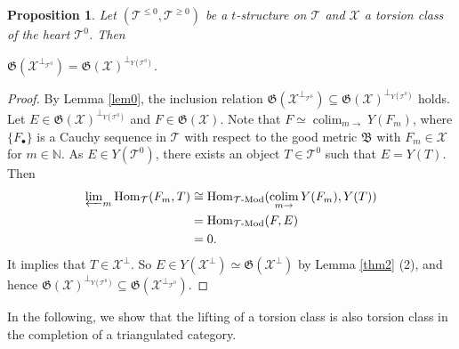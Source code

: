 \documentclass[11pt,a4paper]{amsart}
\numberwithin{equation}{section} \theoremstyle{plain}
\newtheorem{prop}[lem]{Proposition}
\numberwithin{equation}{section} \theoremstyle{definition}
\begin{document}
\begin{prop} Let $(\mathcal{T}^{\leq0},\mathcal{T}^{\geq0})$ be a $t$-structure on $\mathcal{T}$ and $\mathcal{X}$ a torsion class of the heart $\mathcal{T}^{0}$. Then
\begin{center}
$\mathfrak{G}(\mathcal{X}^{\perp_{\mathcal{T}^{0}}})=\mathfrak{G}(\mathcal{X})^{\perp_{Y(\mathcal{T}^{0})}}$.
\end{center}
\end{prop}
\begin{proof} By Lemma \ref{lem0}, the inclusion relation $\mathfrak{G}(\mathcal{X}^{\perp_{\mathcal{T}^{0}}})\subseteq\mathfrak{G}(\mathcal{X})^{\perp_{Y(\mathcal{T}^{0})}}$ holds. Let $E\in\mathfrak{G}(\mathcal{X})^{\perp_{Y(\mathcal{T}^{0})}}$ and $F\in\mathfrak{G}(\mathcal{X})$. Note that $F\simeq\displaystyle\operatorname*{colim}_{m\to}Y(F_{m})$, where $\{F_{\bullet}\}$ is a Cauchy sequence in $\mathcal{T}$ with respect to the good metric $\mathfrak{B}$ with $F_{m}\in\mathcal{X}$ for $m\in\mathbb{N}$. As $E\in Y(\mathcal{T}^{0})$, there exists an object $T\in\mathcal{T}^{0}$ such that $E=Y(T)$. Then
\begin{align*}
\varprojlim\nolimits_{m }{\rm Hom}_{\mathcal{T}}(F_{m}, T)
& \cong {\rm Hom}_{\mathcal{T}\text{-Mod}}(\displaystyle\operatorname*{colim}_{m\to}Y(F_{m}),Y(T)) \\
&= {\rm Hom}_{\mathcal{T}\text{-Mod}}(F, E)\\
&= 0.
\end{align*}It implies that $T\in\mathcal{X}^{\perp}$. So $E\in Y(\mathcal{X}^{\perp})\simeq\mathfrak{G}(\mathcal{X}^{\perp})$ by Lemma \ref{thm2} (2), and hence $\mathfrak{G}(\mathcal{X})^{\perp_{Y(\mathcal{T}^{0})}}\subseteq\mathfrak{G}(\mathcal{X}^{\perp_{\mathcal{T}^{0}}})$.
\end{proof}

In the following, we show that the lifting of a torsion class is also torsion class in the completion of a triangulated category.
\end{document}
